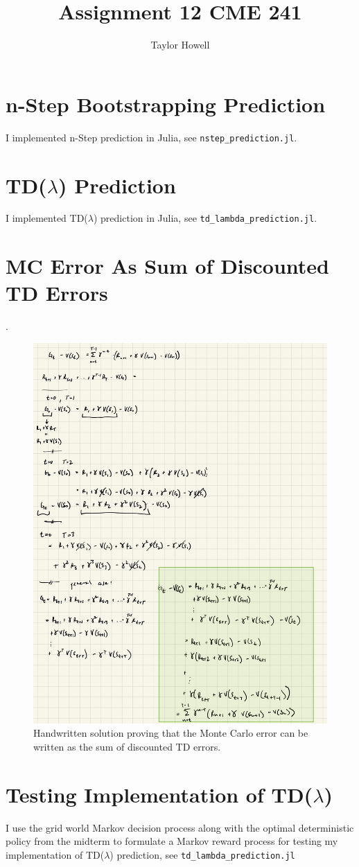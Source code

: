 \documentclass[12pt]{article}
\title{\textbf{Assignment 12 CME 241}}
\author{Taylor Howell}
\begin{document}
\maketitle

\newpage
\section{n-Step Bootstrapping Prediction}
I implemented n-Step prediction in Julia, see \texttt{nstep\_prediction.jl}.

\section{TD($\lambda$) Prediction}
I implemented TD($\lambda$) prediction in Julia, see \texttt{td\_lambda\_prediction.jl}.

\newpage
\section{MC Error As Sum of Discounted TD Errors}.
\begin{figure}[H]
	\centering
	\includegraphics[width=.75\textwidth]{ipad/q3.jpg}
	\caption{Handwritten solution proving that the Monte Carlo error can be written as the sum of discounted TD errors.}
	\label{td_error}
\end{figure}

\clearpage

\section{Testing Implementation of TD($\lambda$)}
I use the grid world Markov decision process along with the optimal deterministic policy from the midterm to formulate a Markov reward process for testing my implementation of TD($\lambda$) prediction, see \texttt{td\_lambda\_prediction.jl}

\end{document}
